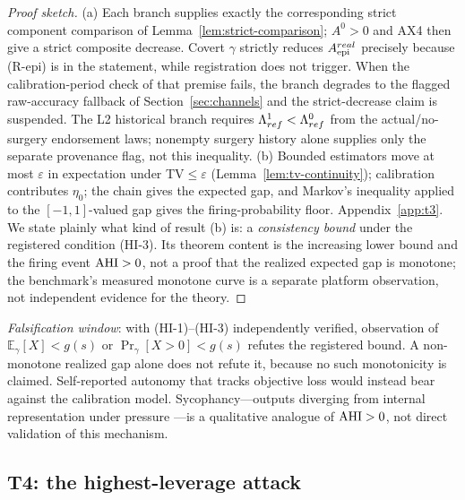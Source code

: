 \begin{proof}[Proof sketch]
(a) Each branch supplies exactly the corresponding strict component
comparison of Lemma~\ref{lem:strict-comparison}; $A^0>0$ and AX4 then give a
strict composite decrease. Covert $\gamma$ strictly reduces $A_{\mathrm{epi}}^{real}$
precisely because (R-epi) is in the statement, while registration does not
trigger. When the calibration-period check of that premise fails, the branch
degrades to the flagged raw-accuracy fallback of Section~\ref{sec:channels}
and the strict-decrease claim is suspended. The L2 historical branch requires
$\Lambda_{ref}^1<\Lambda_{ref}^0$ from the actual/no-surgery endorsement laws;
nonempty surgery history alone supplies only the separate provenance flag,
not this inequality. (b) Bounded
estimators move at most $\varepsilon$ in expectation under TV$\le\varepsilon$
(Lemma~\ref{lem:tv-continuity}); calibration contributes $\eta_0$; the chain
gives the expected gap, and Markov's inequality applied to the $[-1,1]$-valued
gap gives the firing-probability floor.
Appendix~\ref{app:t3}. We state plainly what kind of result (b) is: a
\emph{consistency bound} under the registered condition (HI-3). Its theorem
content is the increasing lower bound and the firing event $\mathrm{AHI}>0$, not a
proof that the realized expected gap is monotone; the benchmark's measured
monotone curve is a separate platform observation, not independent evidence
for the theory.
\end{proof}

\emph{Falsification window}: with (HI-1)--(HI-3) independently verified,
observation of $\mathbb{E}_\gamma[X]<g(s)$ or
$\Pr_\gamma[X>0]<g(s)$ refutes the registered bound. A non-monotone realized
gap alone does not refute it, because no such monotonicity is claimed.
Self-reported autonomy that tracks objective loss would instead bear against
the calibration model. Sycophancy---outputs diverging from internal
representation under pressure \citep{sharma2023}---is a qualitative analogue
of $\mathrm{AHI}>0$, not direct validation of this mechanism.

\subsection{T4: the highest-leverage attack}\label{sec:t4}

